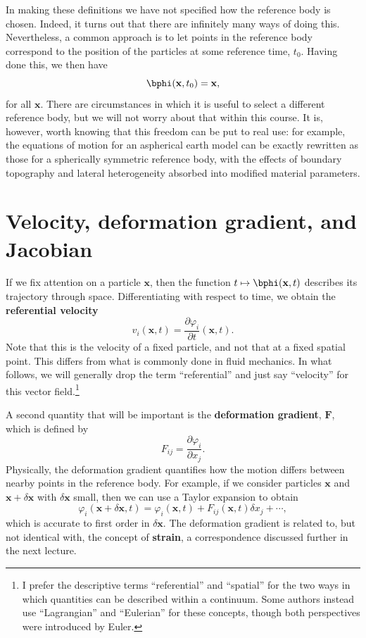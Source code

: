 In making these definitions we have not specified how the reference body is chosen. Indeed, it turns out that there
are infinitely many ways of doing this. Nevertheless, a common approach is to 
let points in the reference body correspond to the position of the particles at some reference time, $t_{0}$. 
Having done this, we then have
\begin{equation}
\bphi(\mathbf{x},t_{0})=\mathbf{x},
\label{eq:1}
\end{equation}
for all $\mathbf{x}$. There are circumstances in which it is useful to select a different reference body, but 
we will not worry about that within this course. It is, however, worth knowing that this freedom can be put to real use: for example, the equations of motion for an 
aspherical earth model can be exactly rewritten as those for a spherically symmetric reference body, with the effects of 
boundary topography and lateral heterogeneity absorbed into modified material parameters. 

\section*{Velocity, deformation gradient, and Jacobian}
If we fix attention on a particle $\mathbf{x}$, then the function $t\mapsto\bphi(\mathbf{x},t)$ describes its 
trajectory through space. Differentiating with respect to time, we obtain the \textbf{referential velocity}
\begin{equation}
v_{i}(\mathbf{x},t)=\frac{\partial\varphi_{i}}{\partial t}(\mathbf{x},t).
\label{eq:2}
\end{equation}
Note that this is the velocity of a fixed particle, and not that at a fixed spatial point. This differs from what is commonly 
done in fluid mechanics. In what follows, we will generally drop the term ``referential'' and just say ``velocity'' for this 
vector field.\footnote{I prefer the descriptive terms ``referential'' and ``spatial'' for the two ways in which quantities can be 
described within a continuum. Some authors instead use ``Lagrangian'' and ``Eulerian'' for these concepts, though
 both perspectives were introduced by Euler.} 

A second quantity that will be important is the \textbf{deformation gradient}, $\mathbf{F}$, which is defined by
\begin{equation}
F_{ij}=\frac{\partial\varphi_{i}}{\partial x_{j}}.
\label{eq:3}
\end{equation}
Physically, the deformation gradient quantifies how the motion differs between nearby points in the reference body. For 
example, if we consider particles $\mathbf{x}$ and $\mathbf{x}+\delta\mathbf{x}$ with $\delta\mathbf{x}$ small, then we can 
use a Taylor expansion to obtain
\begin{equation}
\varphi_{i}(\mathbf{x}+\delta\mathbf{x},t)=\varphi_{i}(\mathbf{x},t)+F_{ij}(\mathbf{x},t)\delta x_{j}+\cdots,
\label{eq:4}
\end{equation}
which is accurate to first order in $\delta\mathbf{x}$. The deformation gradient is related to, but not identical with,
the concept of \textbf{strain}, a correspondence discussed further in the next lecture.

